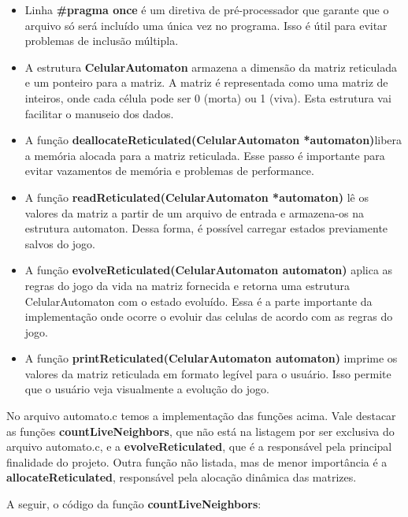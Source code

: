 \documentclass{article}
\begin{document}
 \begin{itemize}
\item Linha \textbf{\#pragma once} é um diretiva de pré-processador que garante que o arquivo só será incluído uma única vez no programa. Isso é útil para evitar problemas de inclusão múltipla.
\item A estrutura \textbf{CelularAutomaton} armazena a dimensão da matriz reticulada e um ponteiro para a matriz. A matriz é representada como uma matriz de inteiros, onde cada célula pode ser 0 (morta) ou 1 (viva). Esta estrutura vai facilitar o manuseio dos dados.
\item A função \textbf{deallocateReticulated(CelularAutomaton *automaton)}libera a memória alocada para a matriz reticulada. Esse passo é importante para evitar vazamentos de memória e problemas de performance.
\item A função \textbf{readReticulated(CelularAutomaton *automaton)} lê os valores da matriz a partir de um arquivo de entrada e armazena-os na estrutura automaton. Dessa forma, é possível carregar estados previamente salvos do jogo.
\item A função \textbf{evolveReticulated(CelularAutomaton automaton)} aplica as regras do jogo da vida na matriz fornecida e retorna uma estrutura CelularAutomaton com o estado evoluído. Essa é a parte importante da implementação onde ocorre o evoluir das celulas de acordo com as regras do jogo.
\item A função \textbf{printReticulated(CelularAutomaton automaton)} imprime os valores da matriz reticulada em formato legível para o usuário. Isso permite que o usuário veja visualmente a evolução do jogo.
 \end{itemize}
 
No arquivo automato.c temos a implementação das funções acima. Vale destacar as funções \textbf{countLiveNeighbors}, que não está na listagem por ser exclusiva do arquivo automato.c, e a \textbf{evolveReticulated}, que é a responsável pela principal finalidade do projeto. Outra função não listada, mas de menor importância é a \textbf{allocateReticulated}, responsável pela alocação dinâmica das matrizes.
 
\hfill\break

\noindent A seguir, o código da função \textbf{countLiveNeighbors}:
 
\end{document}
